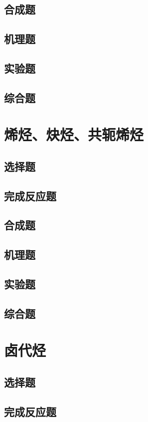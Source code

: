 \documentclass[
  10pt,
  twoside,
  openany,
  b5paper, %
  colorscheme = basic, %
]{qyxf-book}
\begin{document}
\section{合成题}
\section{机理题}
\section{实验题}
\section{综合题}

\chapter{烯烃、炔烃、共轭烯烃}

\section{选择题}
\section{完成反应题}
\section{合成题}
\section{机理题}
\section{实验题}
\section{综合题}

\chapter{卤代烃}

\section{选择题}
\section{完成反应题}
\end{document}
